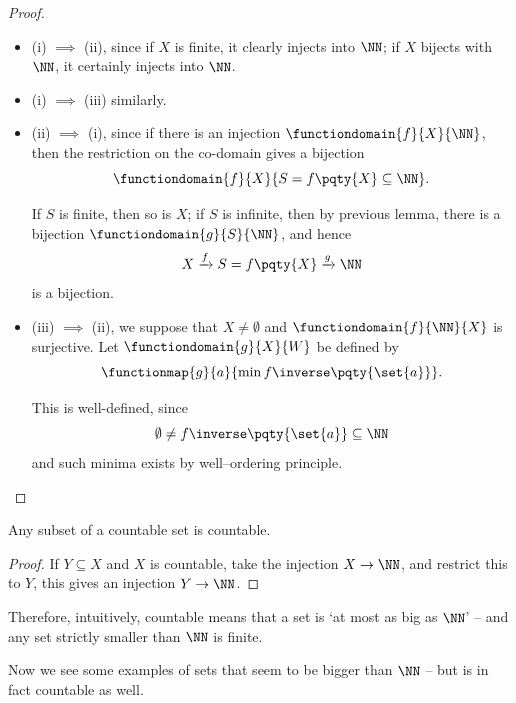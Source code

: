 \begin{proof}
    \begin{itemize}
        \item (i) \(\implies\) (ii), since if \(X\) is finite, it clearly injects into \(\NN\); if \(X\) bijects with \(\NN\), it certainly injects into \(\NN\).
        
        \item (i) \(\implies\) (iii) similarly.

        \item (ii) \(\implies\) (i), since if there is an injection \(\functiondomain{f}{X}{\NN}\), then the restriction on the co-domain gives a bijection
        \[
            \functiondomain{f}{X}{S = f\pqty{X} \subseteq \NN}.
        \]

        If \(S\) is finite, then so is \(X\); if \(S\) is infinite, then by previous lemma, there is a bijection \(\functiondomain{g}{S}{\NN}\), and hence
        \[
            X \xrightarrow{f} S = f\pqty{X} \xrightarrow{g} \NN
        \]
        is a bijection.

        \item (iii) \(\implies\) (ii), we suppose that \(X \neq \emptyset\) and \(\functiondomain{f}{\NN}{X}\) is surjective. Let \(\functiondomain{g}{X}{W}\) be defined by
        \[
            \functionmap{g}{a}{\min f\inverse\pqty{\set{a}}}.
        \]

        This is well-defined, since
        \[
            \emptyset \neq f\inverse\pqty{\set{a}} \subseteq \NN
        \]
        and such minima exists by well--ordering principle.
    \end{itemize}
\end{proof}

\begin{corollary}
    Any subset of a countable set is countable.
\end{corollary}

\begin{proof}
    If \(Y \subseteq X\) and \(X\) is countable, take the injection \(X \to \NN\), and restrict this to \(Y\), this gives an injection \(Y \to \NN\).
\end{proof}

Therefore, intuitively, countable means that a set is `at most as big as \(\NN\)' -- and any set strictly smaller than \(\NN\) is finite.

Now we see some examples of sets that seem to be bigger than \(\NN\) -- but is in fact countable as well.

